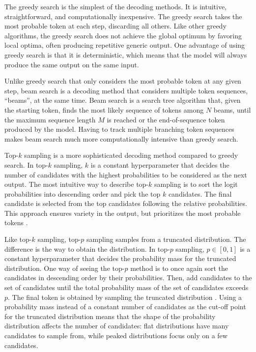 \documentclass[english, 12pt, a4paper, sci, utf8, a-2b, online]{latex/definitions/aaltothesis}
\begin{document}
The greedy search is the simplest of the decoding methods. It is intuitive, straightforward, and computationally inexpensive. The greedy search takes the most probable token at each step, discarding all others. Like other greedy algorithms, the greedy search does not achieve the global optimum by favoring local optima, often producing repetitive generic output. One advantage of using greedy search is that it is deterministic, which means that the model will always produce the same output on the same input.

Unlike greedy search that only considers the most probable token at any given step, beam search is a decoding method that considers multiple token sequences, ``beams'', at the same time. Beam search is a search tree algorithm that, given the starting token, finds the most likely sequence of tokens among $N$ beams, until the maximum sequence length $M$ is reached or the end-of-sequence token produced by the model. Having to track multiple branching token sequences makes beam search much more computationally intensive than greedy search.

Top-$k$ sampling is a more sophisticated decoding method compared to greedy search. In top-$k$ sampling, $k$ is a constant hyperparameter that decides the number of candidates with the highest probabilities to be considered as the next output. The most intuitive way to describe top-$k$ sampling is to sort the logit probabilities into descending order and pick the top $k$ candidates. The final candidate is selected from the top candidates following the relative probabilities. This approach ensures variety in the output, but prioritizes the most probable tokens \cite{holtzman2020curiouscaseneuraltext}.

Like top-$k$ sampling, top-$p$ sampling samples from a truncated distribution. The difference is the way to obtain the distribution. In top-$p$ sampling, $p \in [0, 1]$ is a constant hyperparameter that decides the probability mass for the truncated distribution. One way of seeing the top-$p$ method is to once again sort the candidates in descending order by their probabilities. Then, add candidates to the set of candidates until the total probability mass of the set of candidates exceeds $p$. The final token is obtained by sampling the truncated distribution \cite{holtzman2020curiouscaseneuraltext}. Using a probability mass instead of a constant number of candidates as the cut-off point for the truncated distribution means that the shape of the probability distribution affects the number of candidates: flat distributions have many candidates to sample from, while peaked distributions focus only on a few candidates.
\end{document}
